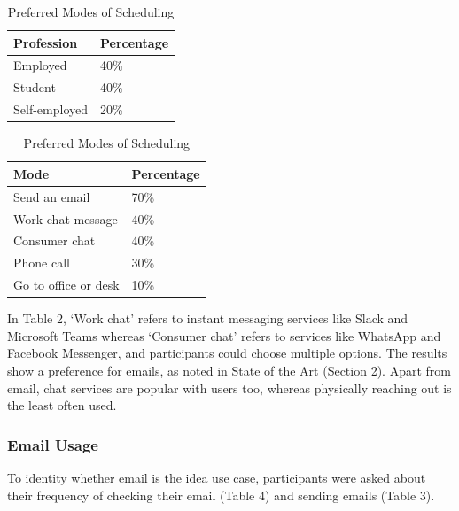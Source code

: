 \documentclass{article}
\begin{document}
\begin{table}[!htb]
    \begin{minipage}{.5\linewidth}
   	 \caption{Professions of Participants}
      \centering
        \begin{tabular}{ll}
	        \hline
            \textbf{Profession} & \textbf{Percentage} \\
            \hline
            Employed & 40\% \\
            Student & 40\% \\
            Self-employed & 20\% \\
            \hline
        \end{tabular}
    \end{minipage}%
    \hspace{.1cm}
    \begin{minipage}{.5\linewidth}
      \centering
	    \caption{Preferred Modes of Scheduling}
        \begin{tabular}{ll}
	        \hline
            \textbf{Mode} & \textbf{Percentage} \\
            \hline
            Send an email & 70\% \\
            Work chat message & 40\% \\
            Consumer chat & 40\% \\
            Phone call & 30\% \\
            Go to office or desk & 10\% \\
            \hline
        \end{tabular}
    \end{minipage} 
\end{table}

In Table 2, `Work chat' refers to instant messaging services like Slack and Microsoft Teams whereas `Consumer chat' refers to services like WhatsApp and Facebook Messenger, and participants could choose multiple options. The results show a preference for emails, as noted in State of the Art (Section 2). Apart from email, chat services are popular with users too, whereas physically reaching out is the least often used.

\subsubsection{Email Usage}

To identity whether email is the idea use case, participants were asked about their frequency of checking their email (Table 4) and sending emails (Table 3).
\end{document}
